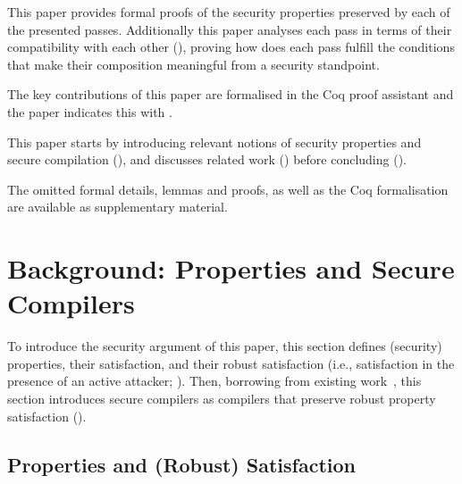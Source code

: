 \documentclass[dvipsnames,conference]{IEEEtran}
\theoremstyle{definition}
\begin{document}
\begin{asparaitem}[$\blacktriangleright$]
  \item %
  		This paper provides formal proofs of the security properties preserved by each of the presented passes. 
  		Additionally this paper analyses each pass in terms of their compatibility with each other (), proving how does each pass fulfill the conditions that make their composition meaningful from a security standpoint.

  \item The key contributions of this paper are formalised in the Coq proof assistant and the paper indicates this with \CoqSymbol.
\end{asparaitem}
% 
This paper starts by introducing relevant notions of security properties and secure compilation (),
and discusses related work () before concluding ().

The omitted formal details, lemmas and proofs, as well as the Coq formalisation are available as supplementary material.













\section{Background: Properties and Secure Compilers}\label{sec:background}

To introduce the security argument of this paper, this section defines (security) properties, their satisfaction, and their robust satisfaction (i.e., satisfaction in the presence of an active attacker; ).
Then, borrowing from existing work~\cite{abate2019jour,abate2021extacc}, this section introduces secure compilers as compilers that preserve robust property satisfaction ().

\subsection{Properties and (Robust) Satisfaction}\label{subsec:bg:tprop}
\end{document}
